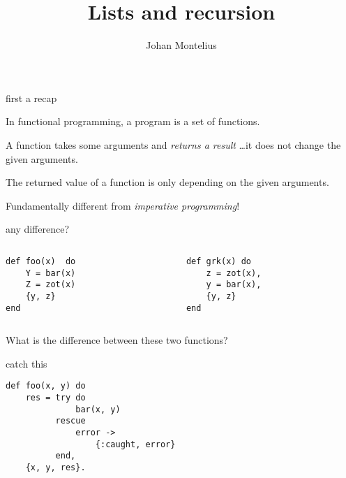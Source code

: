 

\title[ID1019 Recursion]{Lists and recursion}


\author{Johan Montelius}
\date{\semester}



\begin{frame}
\titlepage
\end{frame}

\begin{frame}{first a recap}

\pause In functional programming, a program is a set of functions.

\vspace{20pt}\pause A function takes some arguments and {\em returns a result} \ldots it does not change the given arguments.

\vspace{20pt}\pause The returned value of a function is only depending on the given arguments.

\vspace{20pt}\pause Fundamentally different from {\em imperative programming}!


\end{frame}

\begin{frame}[fragile]{any difference?}

\begin{columns}
 \begin{column}{0.5\linewidth}
\begin{verbatim} 
def foo(x)  do
    Y = bar(x)
    Z = zot(x)
    {y, z}
end
\end{verbatim}
 \end{column}
 \pause  
  \begin{column}{0.5\linewidth}
\begin{verbatim} 
def grk(x) do
    z = zot(x),
    y = bar(x),
    {y, z}
end
\end{verbatim}
 \end{column}
\end{columns}

\vspace{40pt} 
\pause What is the difference between these two functions?

\end{frame}

\begin{frame}[fragile]{catch this}
\begin{verbatim}
def foo(x, y) do
    res = try do
              bar(x, y)
          rescue
              error ->
                  {:caught, error}
          end,
    {x, y, res}.
\end{verbatim}
\end{frame}


